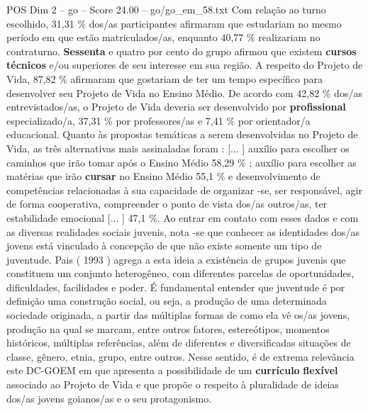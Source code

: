 \begin{textsample}{POS Dim 2 – go – Score 24.00 – go/go\_em\_58.txt}
Com relação ao turno escolhido, 31,31 \% dos/as participantes afirmaram que estudariam no mesmo período em que estão matriculados/as, enquanto 40,77 \% realizariam no contraturno. \textbf{Sessenta} e quatro por cento do grupo afirmou que existem \textbf{cursos} \textbf{técnicos} e/ou superiores de seu interesse em sua região.
A respeito do Projeto de Vida, 87,82 \% afirmaram que gostariam de ter um tempo específico para desenvolver seu Projeto de Vida no Ensino Médio.
De acordo com 42,82 \% dos/as entrevistados/as, o Projeto de Vida deveria ser desenvolvido por \textbf{profissional} especializado/a, 37,31 \% por professores/as e 7,41 \% por orientador/a educacional.
Quanto às propostas temáticas a serem desenvolvidas no Projeto de Vida, as três alternativas mais assinaladas foram : [... ] auxílio para escolher os caminhos que irão tomar após o Ensino Médio 58,29 \% ; auxílio para escolher as matérias que irão \textbf{cursar} no Ensino Médio 55,1 \% e desenvolvimento de competências relacionadas à sua capacidade de organizar -se, ser responsável, agir de forma cooperativa, compreender o ponto de vista dos/as outros/as, ter estabilidade emocional [... ] 47,1 \%.
Ao entrar em contato com esses dados e com as diversas realidades sociais juvenis, nota -se que conhecer as identidades dos/as jovens está vinculado à concepção de que não existe somente um tipo de juventude.
Pais ( 1993 ) agrega a esta ideia a existência de grupos juvenis que constituem um conjunto heterogêneo, com diferentes parcelas de oportunidades, dificuldades, facilidades e poder.
É fundamental entender que juventude é por definição uma construção social, ou seja, a produção de uma determinada sociedade originada, a partir das múltiplas formas de como ela vê os/as jovens, produção na qual se marcam, entre outros fatores, estereótipos, momentos históricos, múltiplas referências, além de diferentes e diversificadas situações de classe, gênero, etnia, grupo, entre outros.
Nesse sentido, é de extrema relevância este DC-GOEM em que apresenta a possibilidade de um \textbf{currículo} \textbf{flexível} associado ao Projeto de Vida e que propõe o respeito à pluralidade de ideias dos/as jovens goianos/as e o seu protagonismo.

\end{textsample}
